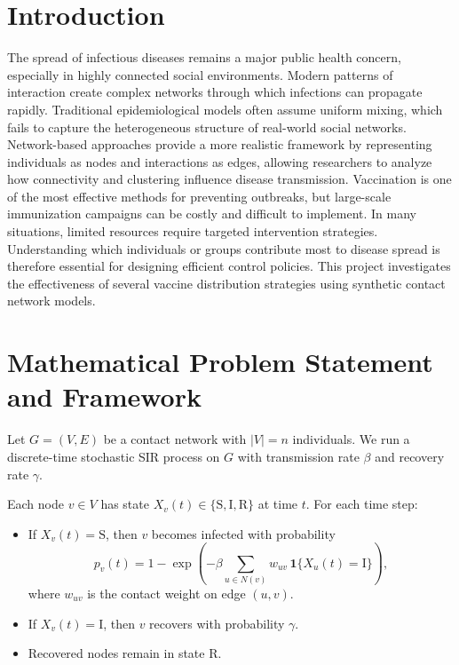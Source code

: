\documentclass[9pt,twocolumn,twoside]{pnas-new}
\begin{document}
\section*{Introduction}
The spread of infectious diseases remains a major public health concern, especially in highly connected social environments. Modern patterns of interaction create complex networks through which infections can propagate rapidly. Traditional epidemiological models often assume uniform mixing, which fails to capture the heterogeneous structure of real-world social networks. Network-based approaches provide a more realistic framework by representing individuals as nodes and interactions as edges, allowing researchers to analyze how connectivity and clustering influence disease transmission. Vaccination is one of the most effective methods for preventing outbreaks, but large-scale immunization campaigns can be costly and difficult to implement. In many situations, limited resources require targeted intervention strategies. Understanding which individuals or groups contribute most to disease spread is therefore essential for designing efficient control policies. This project investigates the effectiveness of several vaccine distribution strategies using synthetic contact network models. 

\section*{Mathematical Problem Statement and Framework}

Let $G=(V,E)$ be a contact network with $|V|=n$ individuals. We run a discrete-time stochastic SIR process on $G$ with transmission rate $\beta$ and recovery rate $\gamma$.

Each node $v\in V$ has state $X_v(t)\in\{\mathrm{S},\mathrm{I},\mathrm{R}\}$ at time $t$. For each time step:
\begin{itemize}
    \item If $X_v(t)=\mathrm{S}$, then $v$ becomes infected with probability
    \begin{equation}
    p_v(t)=1-\exp\!\left(-\beta\sum_{u\in N(v)} w_{uv}\,\mathbf{1}\{X_u(t)=\mathrm{I}\}\right),
    \end{equation}
    where $w_{uv}$ is the contact weight on edge $(u,v)$.

    \item If $X_v(t)=\mathrm{I}$, then $v$ recovers with probability $\gamma$.

    \item Recovered nodes remain in state $\mathrm{R}$.
\end{itemize}
\end{document}
